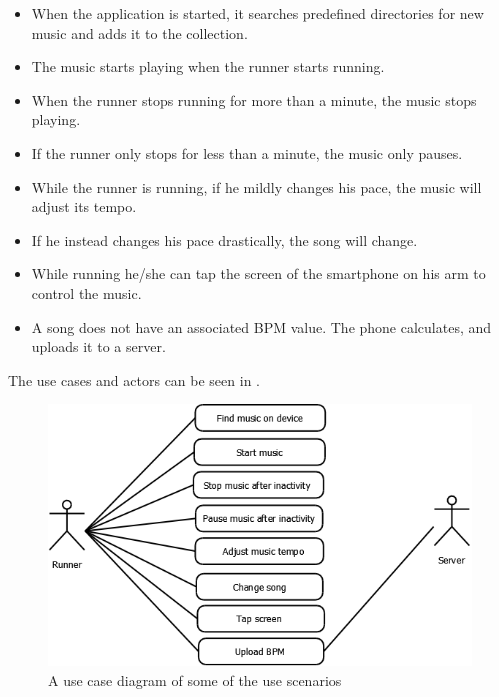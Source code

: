 \begin{itemize}
	\item When the application is started, it searches predefined directories for new music and adds it to the collection.
	\item The music starts playing when the runner starts running.
	\item When the runner stops running for more than a minute, the music stops playing.
	\item If the runner only stops for less than a minute, the music only pauses.
	\item While the runner is running, if he mildly changes his pace, the music will adjust its tempo.
	\item If he instead changes his pace drastically, the song will change.
	\item While running he/she can tap the screen of the smartphone on his arm to control the music.
	\item A song does not have an associated BPM value. The phone calculates, and uploads it to a server.
\end{itemize}

The use cases and actors can be seen in .

\begin{figure}[h!]
  \centering
    \includegraphics[width=\textwidth]{Images/useCase.png}
    \caption{A use case diagram of some of the use scenarios}
    \label{fig:useCase}
\end{figure}

